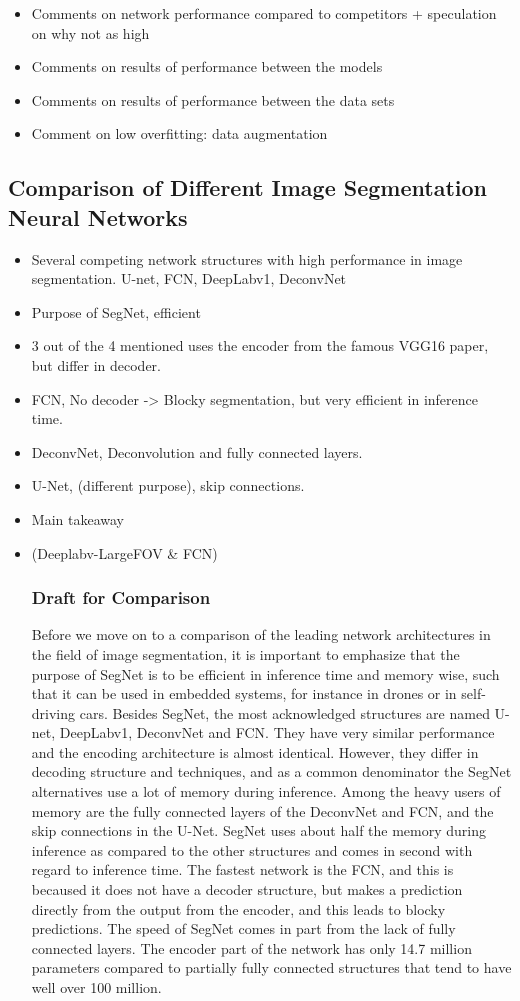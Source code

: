 \documentclass{article}
\begin{document}
\begin{itemize}
\item Comments on network performance compared to competitors + speculation on why not as high
\item Comments  on results of performance between the models
\item Comments on results of performance between the data sets
\item Comment on low overfitting: data augmentation
\end{itemize}


\label{sec:foot}
\subsection{Comparison of Different Image Segmentation Neural Networks}
\begin{itemize}
	\item Several competing network structures with high performance in image segmentation. U-net, FCN, DeepLabv1, DeconvNet
	\item Purpose of SegNet, efficient
	\item 3 out of the 4 mentioned uses the encoder from the famous VGG16 paper, but differ in decoder.
	\item FCN, No decoder -> Blocky segmentation, but very efficient in inference time.
	\item DeconvNet, Deconvolution and fully connected layers. 
	\item U-Net, (different purpose), skip connections. 
	\item Main takeaway  
	\item (Deeplabv-LargeFOV \& FCN)
	
\subsubsection{Draft for Comparison}
Before we move on to a comparison of the leading network architectures in the field of image segmentation, it is important to emphasize that the purpose of SegNet is to be efficient in inference time and memory wise, such that it can be used in embedded systems, for instance in drones or in self-driving cars.
Besides SegNet, the most acknowledged structures are named U-net, DeepLabv1, DeconvNet and FCN.
They have very similar performance and the encoding architecture is almost identical.
However, they differ in decoding structure and techniques, and as a common denominator the SegNet alternatives use a lot of memory during inference.
Among the heavy users of memory are the fully connected layers of the DeconvNet and FCN, and the skip connections in the U-Net.
SegNet uses about half the memory during inference as compared to the other structures and comes in second with regard to inference time.
The fastest network is the FCN, and this is becaused it does not have a decoder structure, but makes a prediction directly from the output from the encoder, and this leads to blocky predictions.
The speed of SegNet comes in part from the lack of fully connected layers.
The encoder part of the network has only 14.7 million parameters compared to partially fully connected structures that tend to have well over 100 million. \cite{seg}


\end{itemize}
\end{document}
